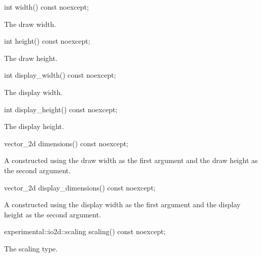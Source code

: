 %
\begin{itemdecl}
int width() const noexcept;
\end{itemdecl}
\begin{itemdescr}
\pnum
\returns
The draw width.
\end{itemdescr}

%
\begin{itemdecl}
int height() const noexcept;
\end{itemdecl}
\begin{itemdescr}
\pnum
\returns
The draw height.
\end{itemdescr}

%
\begin{itemdecl}
int display_width() const noexcept;
\end{itemdecl}
\begin{itemdescr}
\pnum
\returns
The display width.
\end{itemdescr}

%
\begin{itemdecl}
int display_height() const noexcept;
\end{itemdecl}
\begin{itemdescr}
\pnum
\returns
The display height.
\end{itemdescr}

%
\begin{itemdecl}
vector_2d dimensions() const noexcept;
\end{itemdecl}
\begin{itemdescr}
\pnum
\returns
A  constructed using the draw width as the first argument and the draw height as the second argument.
\end{itemdescr}

%
\begin{itemdecl}
vector_2d display_dimensions() const noexcept;
\end{itemdecl}
\begin{itemdescr}
\pnum
\returns
A  constructed using the display width as the first argument and the display height as the second argument.
\end{itemdescr}

%
\begin{itemdecl}
experimental::io2d::scaling scaling() const noexcept;
\end{itemdecl}
\begin{itemdescr}
\pnum
\returns
The scaling type.
\end{itemdescr}


